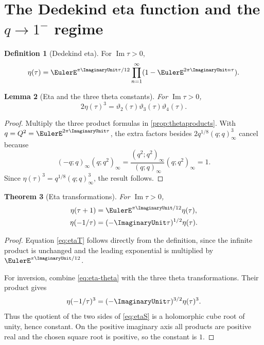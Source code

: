 \documentclass[11pt]{article}
\numberwithin{equation}{section}
\newtheorem{theorem}{Theorem}[section]
\newtheorem{lemma}[theorem]{Lemma}
\theoremstyle{definition}
\newtheorem{definition}[theorem]{Definition}
\theoremstyle{remark}
\begin{document}
\section{The Dedekind eta function and the $q\to1^-$ regime}

\begin{definition}[Dedekind eta]
For $\operatorname{Im}\tau>0$,
\[
\eta(\tau)=\EulerE^{\pi\ImaginaryUnit\tau/12}
\prod_{n=1}^{\infty}(1-\EulerE^{2\pi\ImaginaryUnit n\tau}).
\]
\end{definition}

\begin{lemma}[Eta and the three theta constants]\label{lem:eta-theta}
For $\operatorname{Im}\tau>0$,
\begin{equation}\label{eq:eta-theta}
2\eta(\tau)^3=\vartheta_2(\tau)\vartheta_3(\tau)\vartheta_4(\tau).
\end{equation}
\end{lemma}
\begin{proof}
Multiply the three product formulas in \cref{prop:thetaproducts}.  With
$q=Q^2=\EulerE^{2\pi\ImaginaryUnit\tau}$, the extra factors besides
$2q^{1/8}(q;q)_\infty^3$ cancel because
\[
(-q;q)_\infty(q;q^2)_\infty
=\frac{(q^2;q^2)_\infty}{(q;q)_\infty}(q;q^2)_\infty=1.
\]
Since $\eta(\tau)^3=q^{1/8}(q;q)_\infty^3$, the result follows.
\end{proof}

\begin{theorem}[Eta transformations]\label{thm:eta-transform}
For $\operatorname{Im}\tau>0$,
\begin{align}
\eta(\tau+1)&=\EulerE^{\pi\ImaginaryUnit/12}\eta(\tau),\label{eq:etaT}\\
\eta(-1/\tau)&=(-\ImaginaryUnit\tau)^{1/2}\eta(\tau).
\label{eq:etaS}
\end{align}
\end{theorem}
\begin{proof}
Equation \eqref{eq:etaT} follows directly from the definition, since the
infinite product is unchanged and the leading exponential is multiplied by
$\EulerE^{\pi\ImaginaryUnit/12}$.

For inversion, combine \eqref{eq:eta-theta} with the three theta
transformations.  Their product gives
\[
\eta(-1/\tau)^3=(-\ImaginaryUnit\tau)^{3/2}\eta(\tau)^3.
\]
Thus the quotient of the two sides of \eqref{eq:etaS} is a holomorphic
cube root of unity, hence constant.  On the positive imaginary axis all
products are positive real and the chosen square root is positive, so the
constant is $1$.
\end{proof}
\end{document}
